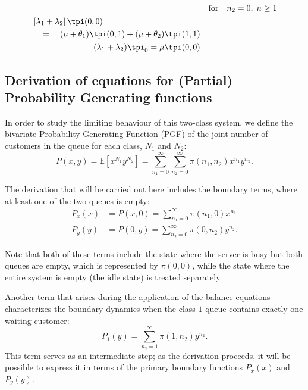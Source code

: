\begin{align}
\begin{split}
    \end{split}
    && \text{for} \quad n_2=0, \; n \geq 1 \label{eq:gen:tilde_balance_y_boundary} \\
    \begin{split}
        & \left[ \lambda_1 + \lambda_2 \right] \tpi(0,0) \\
        & \quad = \quad (\mu + \theta_1) \tpi(0,1) + (\mu + \theta_2) \tpi(1,1)
    \end{split}
    && \label{eq:gen:tilde_balance_zero} \\
    \begin{split}
        (\lambda_1+\lambda_2) \tpi_0 = \mu \tpi(0,0)
    \end{split}
    && \label{eq:gen:tilde_balance_idle}
\end{align}


\subsection{Derivation of equations for (Partial) Probability Generating functions} \label{ssec:pgf_derivation}

In order to study the limiting behaviour of this two-class system, we define the bivariate Probability Generating Function (PGF) of the joint number of customers in the queue for each class, $N_1$ and $N_2$:
\begin{equation}
    P(x,y) = \mathbb{E}[x^{N_1} y^{N_2}] = \sum_{n_1=0}^{\infty} \sum_{n_2=0}^{\infty} \pi(n_1,n_2) x^{n_1} y^{n_2}.
\end{equation}

The derivation that will be carried out here includes the boundary terms, where at least one of the two queues is empty:
\begin{align}
    P_x(x) &= P(x,0) = \sum_{n_1=0}^{\infty} \pi(n_1,0) x^{n_1} \\
    P_y(y) &= P(0,y) = \sum_{n_2=0}^{\infty} \pi(0,n_2) y^{n_2}.
\end{align}

Note that both of these terms include the state where the server is busy but both queues are empty, which is represented by $\pi(0,0)$, while the state where the entire system is empty (the idle state) is treated separately.


Another term that arises during the application of the balance equations characterizes the boundary dynamics when the class-$1$ queue contains exactly one waiting customer:
\begin{equation}
    P_1(y) = \sum_{n_2=1}^{\infty} \pi(1,n_2) y^{n_2}.
\end{equation}
This term serves as an intermediate step; as the derivation proceeds, it will be possible to express it in terms of the primary boundary functions $P_x(x)$ and $P_y(y)$.


